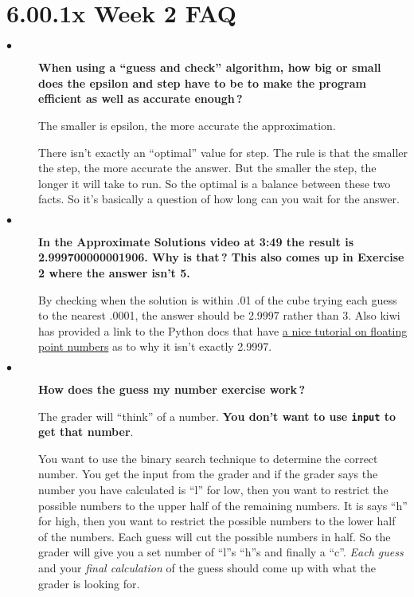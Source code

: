 \documentclass{article}
\newcommand{\inlinecode}[1]{\texttt{#1}}
\newcommand{\link}[2]{\textcolor{blue}{\href{#2}{#1}}}
\newcommand{\question}[1]{\item[$\bullet$] 
	\begin{minipage}[t]{\textwidth}
		\bfseries#1
	\end{minipage}
	\hfil
}
\newenvironment{answer}{}{}
\newenvironment{faq}{\begin{description}}{\end{description}}
\begin{document}
	
	\section*{\Huge6.00.1x Week 2 FAQ}
	
	\begin{faq}
		\question{When using a ``guess and check'' algorithm, how big or small does the epsilon and step have to be to make the program efficient as well as accurate enough\,?}
		\begin{answer}
			The smaller is epsilon, the more accurate the approximation.
			
			There isn't exactly an ``optimal'' value for step.  The rule is that the smaller the step, the more accurate the answer. But the smaller the step, the longer it will take to run.  So the optimal is a balance between these two facts.  So it's basically a question of how long can you wait for the answer.
		\end{answer}
		
		\question{In the Approximate Solutions video at 3:49 the result is 2.999700000001906.  Why is that\,?  This also comes up in Exercise 2 where the answer isn't 5.}
		\begin{answer}
			By checking when the solution is within .01 of the cube trying each guess to the nearest .0001, the answer should be 2.9997 rather than 3.  Also kiwi has provided a link to the Python docs that have \link{a nice tutorial on floating point numbers}{https://docs.python.org/3/tutorial/floatingpoint.html} as to why it isn't exactly 2.9997.
		\end{answer}
		
		\question{How does the guess my number exercise work\,?}
		\begin{answer}
			The grader will ``think'' of a number. \textbf{You don't want to use \inlinecode{input} to get that number}.
			
			You want to use the binary search technique to determine the correct number. You get the input from the grader and if the grader says the number you have calculated is ``l'' for low, then you want to restrict the possible numbers to the upper half of the remaining numbers. It is says ``h'' for high, then you want to restrict the possible numbers to the lower half of the numbers. Each guess will cut the possible numbers in half. So the grader will give you a set number of ``l''s ``h''s and finally a ``c''. \textit{Each guess} and your \textit{final calculation} of the guess should come up with what the grader is looking for.
		\end{answer}
		

\end{faq}
\end{document}
